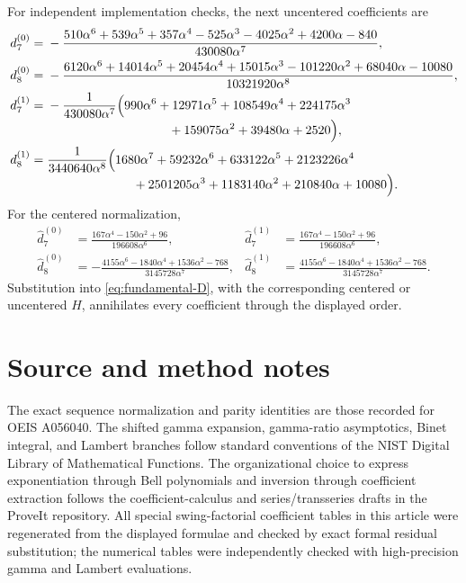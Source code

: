 \documentclass[11pt,a4paper]{article}
\theoremstyle{clean}
\theoremstyle{definition}
\newcommand{\al}{\alpha}
\begin{document}
For independent implementation checks, the next uncentered coefficients are
\begin{align}
 d_7^{(0)}={}&-
 \frac{510\al^6+539\al^5+357\al^4-525\al^3-4025\al^2+4200\al-840}
 {430080\al^7},
 \label{eq:d7-even}\\
 d_8^{(0)}={}&-
 \frac{6120\al^6+14014\al^5+20454\al^4+15015\al^3-101220\al^2+68040\al-10080}
 {10321920\al^8},
 \label{eq:d8-even}\\
 d_7^{(1)}={}&-\frac{1}{430080\al^7}\Bigl(
 990\al^6+12971\al^5+108549\al^4+224175\al^3
 \nonumber\\[-0.25em]
 &\hspace{34mm}{}+159075\al^2+39480\al+2520\Bigr),
 \label{eq:d7-odd}\\
 d_8^{(1)}={}&\frac{1}{3440640\al^8}\Bigl(
 1680\al^7+59232\al^6+633122\al^5+2123226\al^4
 \nonumber\\[-0.25em]
 &\hspace{24mm}{}+2501205\al^3+1183140\al^2
 +210840\al+10080\Bigr).
 \label{eq:d8-odd}
\end{align}
For the centered normalization,
\begin{align}
 \widehat d_7^{(0)}&=
 \frac{167\al^4-150\al^2+96}{196608\al^6},&
 \widehat d_7^{(1)}&=
 \frac{167\al^4-150\al^2+96}{196608\al^6},
 \label{eq:d7-centered}\\
 \widehat d_8^{(0)}&=-
 \frac{4155\al^6-1840\al^4+1536\al^2-768}{3145728\al^7},&
 \widehat d_8^{(1)}&=
 \frac{4155\al^6-1840\al^4+1536\al^2-768}{3145728\al^7}.
 \label{eq:d8-centered}
\end{align}
Substitution into \cref{eq:fundamental-D}, with the corresponding centered or uncentered \(H\), annihilates every coefficient through the displayed order.

\section{Source and method notes}
\label{app:sources}

The exact sequence normalization and parity identities are those recorded for OEIS A056040.  The shifted gamma expansion, gamma-ratio asymptotics, Binet integral, and Lambert branches follow standard conventions of the NIST Digital Library of Mathematical Functions.  The organizational choice to express exponentiation through Bell polynomials and inversion through coefficient extraction follows the coefficient-calculus and series/transseries drafts in the ProveIt repository.  All special swing-factorial coefficient tables in this article were regenerated from the displayed formulae and checked by exact formal residual substitution; the numerical tables were independently checked with high-precision gamma and Lambert evaluations.
\end{document}
